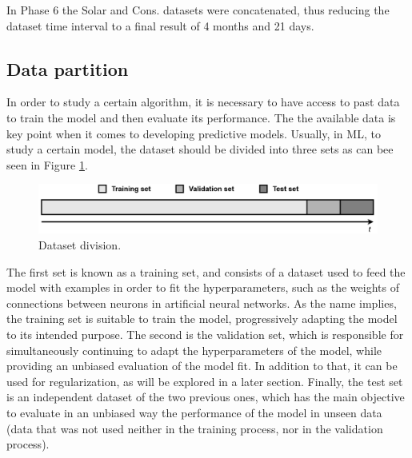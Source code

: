 In Phase 6 the Solar and Cons. datasets were concatenated, thus reducing the dataset time interval to a final result of 4 months and 21 days.

\subsection{Data partition}\label{chap3:subsec:data_partition}

In order to study a certain algorithm, it is necessary to have access to past data to train the model and then evaluate its performance. The the available data is key point when it comes to developing predictive models. Usually, in \ac{ML}, to study a certain model, the dataset should be divided into three sets as can bee seen in Figure \ref{division}. 

\begin{figure}[h!]
    \centering
    \begin{center}
    \includegraphics[width=1\textwidth]{Images/division.png}
    \caption{Dataset division.}
    \label{division}
    \end{center}
\end{figure}

The first set is known as a training set, and consists of a dataset used to feed the model with examples in order to fit the hyperparameters, such as the weights of connections between neurons in artificial neural networks. As the name implies, the training set is suitable to train the model, progressively adapting the model to its intended purpose. The second is the validation set, which is responsible for simultaneously continuing to adapt the hyperparameters of the model, while providing an unbiased evaluation of the model fit. In addition to that, it can be used for regularization, as will be explored in a later section. Finally, the test set is an independent dataset of the two previous ones, which has the main objective to evaluate in an unbiased way the performance of the model in unseen data (data that was not used neither in the training process, nor in the validation process). 

